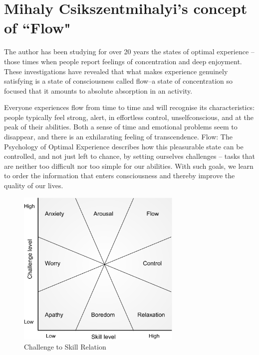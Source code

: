 \section{Mihaly Csikszentmihalyi's concept of ``Flow"}
\label{sec:flow}

The author has been studying for over 20 years the states of optimal experience -- those times when people report feelings of concentration and deep enjoyment. These investigations have revealed that what makes experience genuinely satisfying is a state of consciousness called flow--a state of concentration so focused that it amounts to absolute absorption in an activity. 

Everyone experiences flow from time to time and will recognise its characteristics: people typically feel strong, alert, in effortless control, unselfconscious, and at the peak of their abilities. Both a sense of time and emotional problems seem to disappear, and there is an exhilarating feeling of transcendence. Flow: The Psychology of Optimal Experience describes how this pleasurable state can be controlled, and not just left to chance, by setting ourselves challenges -- tasks that are neither too difficult nor too simple for our abilities. With such goals, we learn to order the information that enters consciousness and thereby improve the quality of our lives.

\begin{figure}[t]
	\centering
	\includegraphics[width=0.7\textwidth]{resources/flow.pdf}
	\caption[Challenge to Skill Relation]{Challenge to Skill Relation}
\end{figure}

